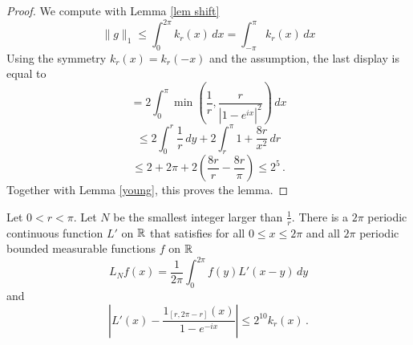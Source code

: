 \begin{proof}
We compute with Lemma \ref{lem shift}
\begin{equation}
    \|g\|_1\le  \int_0^{2\pi}k_r(x)\, dx=\int_{-\pi}^\pi k_r(x)\, dx
\end{equation}
Using the symmetry
$k_r(x)=k_r(-x)$ and the assumption,  the last display
is equal to
\begin{equation*}
    =  2 \int_0^\pi \min\left(\frac 1r, \frac r{|1-e^{ix}|^2}\right)\, dx
\end{equation*}
\begin{equation*}
    \le 2\int_0^{r} \frac 1r \, dy+2\int_r^{\pi}1+\frac {8r}{x^2}\, dr
\end{equation*}
\begin{equation}
    \le 2+2\pi + 2\left(\frac {8r}r-\frac {8r}{\pi}\right)
    \le 2^{5}\, .
\end{equation}
    Together with Lemma \ref{young}, this proves the lemma.
\end{proof}

\begin{lemma}\label{lem dirichlet2}
Let $0<r<\pi$. Let $N$ be the smallest
integer larger than $\frac 1r$.
There is a   $2\pi$ periodic continuous function
    ${L'}$ on $\mathbb{R}$ that satisfies for all $0\le x\le 2\pi$
and all $2\pi$ periodic bounded measurable functions $f$ on $\mathbb{R}$
\begin{equation}\label{lthroughlprime}
    L_Nf(x)=\frac 1{2\pi}\int_{0}^{2\pi}f(y) {L'}(x-y)\, dy
\end{equation}
and
\begin{equation}\label{eqdifflhil}
    |L'(x)-\frac{1_{[r, 2\pi -r]}(x)}{1-e^{-ix}}|\le 2^{10}k_r(x)\, .
\end{equation}
\end{lemma}


